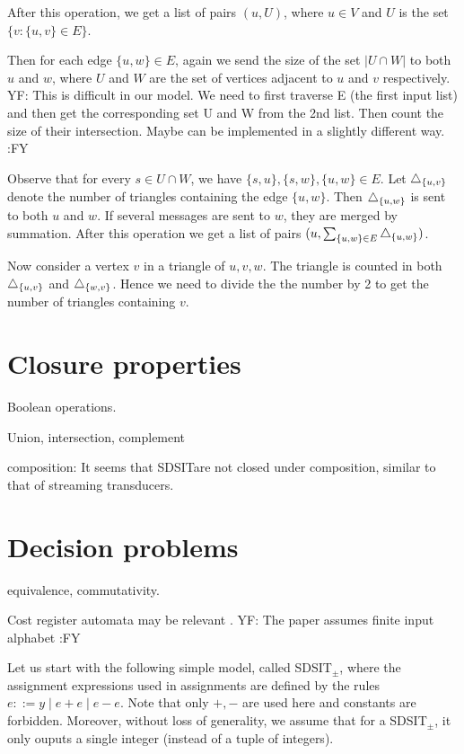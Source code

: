 \documentclass[runningheads,a4paper]{llncs}
\newcommand{\yfc}[1]{\color{blue} {YF: #1 :FY} \color{black}}
\newcommand{\SDSIT}{SDSIT}
\begin{document}
{After this operation, we get a list of pairs $(u, U)$, where $u \in V$ and $U$ is the set $\{ v : \{ u, v \} \in E \}$.

Then for each edge $\{ u, w \} \in E$, again we send the size of the set $| U \cap W |$ to both $u$ and $w$, where $U$ and $W$ are
the set of vertices adjacent to $u$ and $v$ respectively. 
\yfc{This is difficult in our model. We need to first traverse E (the first input list) and then get the corresponding set U and W from the 2nd list. Then count the size of their intersection. Maybe can be implemented in a slightly different way.}

Observe that for every $s \in U \cap W$, we have $\{ s, u \}, \{ s, w \}, \{ u, w
\} \in E$. Let $\triangle_{\{u, v\}}$ denote the number of triangles
containing the edge $\{ u, w \}$. Then $\triangle_{\{u, w\}}$ is sent to
both $u$ and $w$. If several messages are sent to $w$, they are merged
by summation. After this operation we get a list of pairs $(u, \sum_{\{ u, w \} \in E} \triangle_{\{u, w\}})$.

Now consider a vertex $v$ in a triangle of $u, v, w$. The triangle is
counted in both $\triangle_{\{ u, v \}}$ and $\triangle_{\{ w, v \}}$. Hence
we need to divide the the number by 2 to get the number of triangles containing $v$. }


\section{Closure properties}

Boolean operations.

Union, intersection, complement

composition: It seems that \SDSIT are not closed under composition, similar to that of streaming transducers.

\section{Decision problems}

equivalence, commutativity.

Cost register automata may be relevant \cite{ADD+13}. 
\yfc{The paper assumes finite input alphabet}

Let us start with the following simple model, called \SDSIT$_{\pm}$, where the assignment expressions used in assignments are defined by the rules $e::= y \mid e+e \mid e - e$. Note that only $+,-$ are used here and constants are forbidden. Moreover, without loss of generality, we assume that for a \SDSIT$_{\pm}$, it only ouputs a single integer (instead of a tuple of integers).
\end{document}

